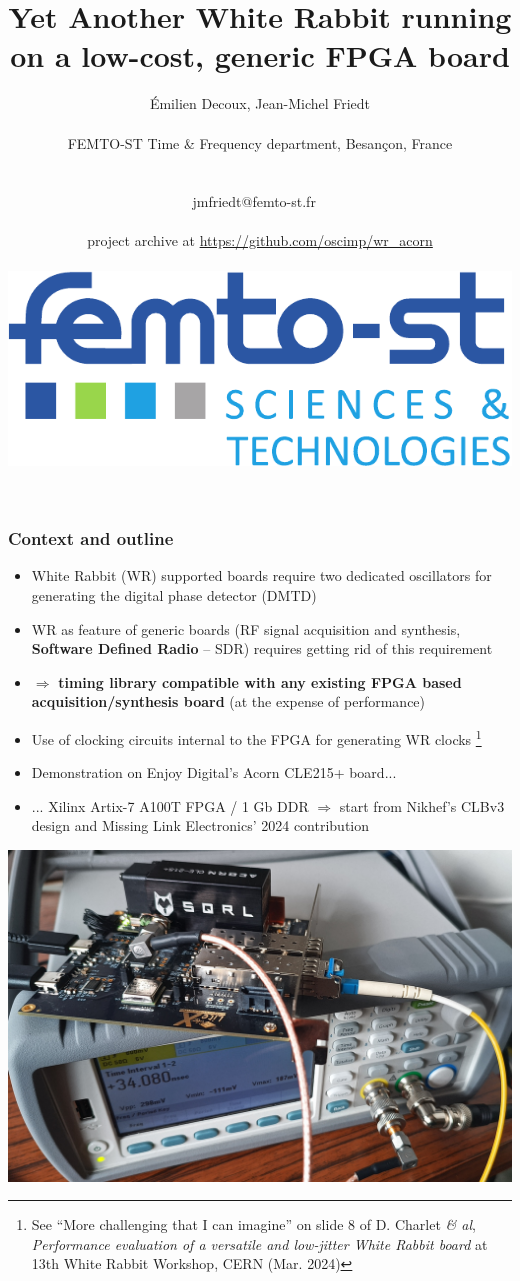 \documentclass[compress,10pt,aspectratio=169]{beamer}
\title{Yet Another White Rabbit running on a low-cost, generic FPGA board}
\author{\'Emilien Decoux, Jean-Michel Friedt\\ \ \\ 
FEMTO-ST Time \& Frequency department, Besan\c con, France \\ \ 
\\ \ \\ jmfriedt@femto-st.fr \ \\ \ \\
project archive at \url{https://github.com/oscimp/wr_acorn}\\
\parbox{1.0\linewidth}{\includegraphics[width=.3\linewidth]{logo_femto.pdf}\hfill
}\vspace{-1cm}  
}
\begin{document}
\maketitle

\begin{frame}[fragile]\frametitle{Context and outline}

\vspace{0.1cm}
{\footnotesize
\begin{itemize}
\item White Rabbit (WR) supported boards require two dedicated oscillators for generating
the digital phase detector (DMTD)
\item WR as feature of generic boards (RF signal acquisition and synthesis, {\bf Software 
Defined Radio} -- SDR) requires getting rid of this requirement
\end{itemize}
}
\begin{minipage}[t]{\linewidth}
\begin{minipage}{.55\linewidth}    
{\footnotesize
\begin{itemize}
\item $\Rightarrow$ {\bf timing library compatible with any existing FPGA based acquisition/synthesis
board} (at the expense of performance)
\item Use of clocking circuits internal to the FPGA for generating WR clocks
\footnote{See ``More challenging that I can imagine'' on slide 8 of D. Charlet {\em \& al}, {\em Performance evaluation of a versatile and low-jitter
White Rabbit board} at 13th White Rabbit Workshop, CERN (Mar. 2024)}
\item Demonstration on Enjoy Digital's Acorn CLE215+ board...
\item ... Xilinx Artix-7 A100T FPGA / 1 Gb DDR $\Rightarrow$ start from Nikhef's  CLBv3 design and Missing Link Electronics' 2024 contribution\footnotemark
\footnotemark
\end{itemize}
}
\end{minipage}
\begin{minipage}{.49\linewidth}
\includegraphics[width=\linewidth]{IMG_20250425_163316_728.jpg}

\end{minipage}
\end{minipage}
\end{frame}
\end{document}
